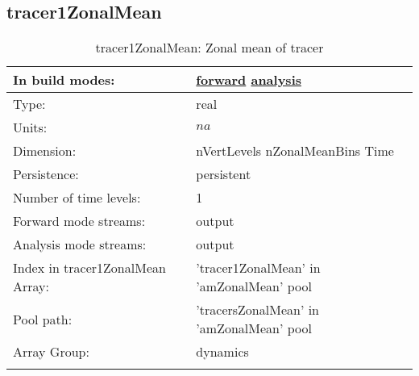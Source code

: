 \subsection[tracer1ZonalMean]{tracer1ZonalMean}
\label{subsec:var_sec_amZonalMean_tracer1ZonalMean}
\begin{center}
\begin{longtable}{| p{2.0in} | p{4.0in} |}
        \hline 
        In build modes: & \hyperref[subsec:forward_var_tab_amZonalMean]{forward} \hyperref[subsec:analysis_var_tab_amZonalMean]{analysis} \\
        \hline 
        Type: & real \\
        \hline 
        Units: & $na$ \\
        \hline 
        Dimension: & nVertLevels nZonalMeanBins Time \\
        \hline 
        Persistence: & persistent \\
        \hline 
        Number of time levels: & 1 \\
        \hline 
		 Forward mode streams: &  output \\
        \hline 
		 Analysis mode streams: &  output \\
        \hline 
		 Index in tracer1ZonalMean Array: & 'tracer1ZonalMean' in 'amZonalMean' pool \\
		 \hline 
            Pool path: & 'tracersZonalMean' in 'amZonalMean' pool
 \\
		 \hline 
		 Array Group: & dynamics \\
		 \hline 
    \caption{tracer1ZonalMean: Zonal mean of tracer}
\end{longtable}
\end{center}
